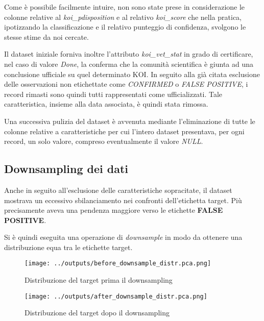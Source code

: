 Come è possibile facilmente intuire, non sono state prese in considerazione 
le colonne relative al \textit{koi\_pdisposition} e al relativo \textit{koi\_score} 
che nella pratica, ipotizzando la classificazione e il relativo punteggio di confidenza, 
svolgono le stesse stime da noi cercate.

Il dataset iniziale forniva inoltre l'attributo \textit{koi\_vet\_stat} in grado di 
certificare, nel caso di valore \textit{Done}, la conferma che la comunità scientifica è 
giunta ad una conclusione ufficiale su quel determinato KOI.
In seguito alla già citata esclusione delle osservazioni non etichettate come \textit{CONFIRMED} 
o \textit{FALSE POSITIVE}, i record rimasti sono quindi tutti rappresentati come ufficializzati.
Tale caratteristica, insieme alla data associata, è quindi stata rimossa.

Una successiva pulizia del dataset è avvenuta mediante l'eliminazione di tutte le colonne 
relative a caratteristiche per cui l'intero dataset presentava, per ogni record, 
un solo valore, compreso eventualmente il valore \textit{NULL}.\\

\subsection{Downsampling dei dati}
Anche in seguito all'esclusione delle caratteristiche sopracitate, il dataset mostrava un 
eccessivo sbilanciamento nei confronti dell'etichetta target. Più precisamente 
aveva una pendenza maggiore verso le etichette \textbf{FALSE POSITIVE}.

Si è quindi eseguita una operazione di \textit{downsample} in modo da ottenere una 
distribuzione equa tra le etichette target.

\begin{figure}[!htb]
    \begin{minipage}{0.48\textwidth}
      \centering
      \texttt{[image: ../outputs/before\_downsample\_distr.pca.png]}
      \caption{Distribuzione del target prima il downsampling}
      \label{Fig:Data1}
    \end{minipage}\hfill
    \begin{minipage}{0.48\textwidth}
      \centering
      \texttt{[image: ../outputs/after\_downsample\_distr.pca.png]}
      \caption{Distribuzione del target dopo il downsampling}
      \label{Fig:Data2}
    \end{minipage}
\end{figure}

